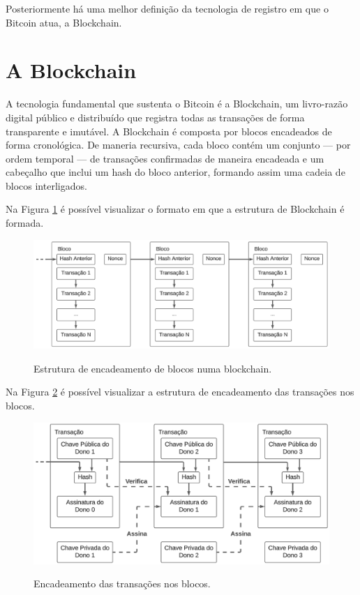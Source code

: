Posteriormente há uma melhor definição da tecnologia de registro em que o Bitcoin atua, a Blockchain.

\section*{A Blockchain} \label{subsec:blockchain}
A tecnologia fundamental que sustenta o Bitcoin é a Blockchain, um livro-razão digital público e distribuído que registra todas as transações de forma transparente e imutável. A Blockchain é composta por blocos encadeados de forma cronológica. De maneria recursiva, cada bloco contém um conjunto — por ordem temporal — de transações confirmadas de maneira encadeada e um cabeçalho que inclui um hash do bloco anterior, formando assim uma cadeia de blocos interligados.

Na Figura \ref*{fig:blockchain} é possível visualizar o formato em que a estrutura de Blockchain é formada.

\begin{figure} [h]
    \centering
        \caption{Estrutura de encadeamento de blocos numa blockchain.}
        \includegraphics[width=.8\linewidth]{images/figura 2.png}
        \label{fig:blockchain}
\end{figure}

Na Figura \ref*{fig:transactions} é possível visualizar a estrutura de encadeamento das transações nos blocos.

\begin{figure} [h]
    \centering
        \caption{Encadeamento das transações nos blocos.}
        \includegraphics[width=.8\linewidth]{images/figura 1.png}
        \label{fig:transactions}

\end{figure} 

